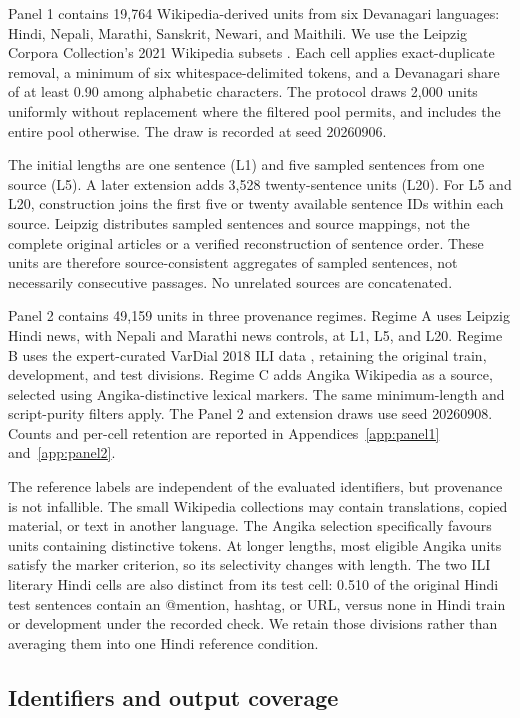 \documentclass[final]{clv2025}
\begin{document}
Panel 1 contains 19,764 Wikipedia-derived units from six Devanagari languages: Hindi, Nepali, Marathi, Sanskrit, Newari, and Maithili. We use the Leipzig Corpora Collection's 2021 Wikipedia subsets \citep{goldhahn-etal-2012-building}. Each cell applies exact-duplicate removal, a minimum of six whitespace-delimited tokens, and a Devanagari share of at least 0.90 among alphabetic characters. The protocol draws 2,000 units uniformly without replacement where the filtered pool permits, and includes the entire pool otherwise. The draw is recorded at seed 20260906.

The initial lengths are one sentence (L1) and five sampled sentences from one source (L5). A later extension adds 3,528 twenty-sentence units (L20). For L5 and L20, construction joins the first five or twenty available sentence IDs within each source. Leipzig distributes sampled sentences and source mappings, not the complete original articles or a verified reconstruction of sentence order. These units are therefore source-consistent aggregates of sampled sentences, not necessarily consecutive passages. No unrelated sources are concatenated.

Panel 2 contains 49,159 units in three provenance regimes. Regime A uses Leipzig Hindi news, with Nepali and Marathi news controls, at L1, L5, and L20. Regime B uses the expert-curated VarDial 2018 ILI data \citep{vardial2018-ili-data}, retaining the original train, development, and test divisions. Regime C adds Angika Wikipedia as a source, selected using Angika-distinctive lexical markers. The same minimum-length and script-purity filters apply. The Panel 2 and extension draws use seed 20260908. Counts and per-cell retention are reported in Appendices~\ref{app:panel1} and~\ref{app:panel2}.

The reference labels are independent of the evaluated identifiers, but provenance is not infallible. The small Wikipedia collections may contain translations, copied material, or text in another language. The Angika selection specifically favours units containing distinctive tokens. At longer lengths, most eligible Angika units satisfy the marker criterion, so its selectivity changes with length. The two ILI literary Hindi cells are also distinct from its test cell: 0.510 of the original Hindi test sentences contain an @mention, hashtag, or URL, versus none in Hindi train or development under the recorded check. We retain those divisions rather than averaging them into one Hindi reference condition.

\subsection{Identifiers and output coverage}
\end{document}
